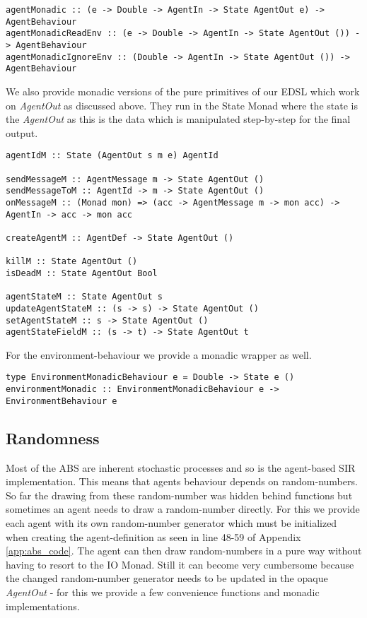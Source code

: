 \begin{verbatim}
agentMonadic :: (e -> Double -> AgentIn -> State AgentOut e) -> AgentBehaviour
agentMonadicReadEnv :: (e -> Double -> AgentIn -> State AgentOut ()) -> AgentBehaviour
agentMonadicIgnoreEnv :: (Double -> AgentIn -> State AgentOut ()) -> AgentBehaviour
\end{verbatim}

We also provide monadic versions of the pure primitives of our EDSL which work on \textit{AgentOut} as discussed above. They run in the State Monad where the state is the \textit{AgentOut} as this is the data which is manipulated step-by-step for the final output. 

\begin{verbatim}
agentIdM :: State (AgentOut s m e) AgentId

sendMessageM :: AgentMessage m -> State AgentOut ()
sendMessageToM :: AgentId -> m -> State AgentOut ()
onMessageM :: (Monad mon) => (acc -> AgentMessage m -> mon acc) -> AgentIn -> acc -> mon acc

createAgentM :: AgentDef -> State AgentOut ()

killM :: State AgentOut ()
isDeadM :: State AgentOut Bool

agentStateM :: State AgentOut s
updateAgentStateM :: (s -> s) -> State AgentOut ()
setAgentStateM :: s -> State AgentOut ()
agentStateFieldM :: (s -> t) -> State AgentOut t
\end{verbatim}

For the environment-behaviour we provide a monadic wrapper as well.

\begin{verbatim}
type EnvironmentMonadicBehaviour e = Double -> State e ()
environmentMonadic :: EnvironmentMonadicBehaviour e -> EnvironmentBehaviour e
\end{verbatim}

\subsection{Randomness}
Most of the ABS are inherent stochastic processes and so is the agent-based SIR implementation. This means that agents behaviour depends on random-numbers. So far the drawing from these random-number was hidden behind functions but sometimes an agent needs to draw a random-number directly. For this we provide each agent with its own random-number generator which must be initialized when creating the agent-definition as seen in line 48-59 of Appendix \ref{app:abs_code}. The agent can then draw random-numbers in a pure way without having to resort to the IO Monad. Still it can become very cumbersome because the changed random-number generator needs to be updated in the opaque \textit{AgentOut} - for this we provide a few convenience functions and monadic implementations.

